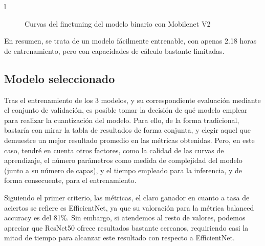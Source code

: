 l\begin{figure}[H]
	\centering
	\caption{Curvas del finetuning del modelo binario con Mobilenet V2}
	\label{fig:curvasmbin}
\end{figure}

En resumen, se trata de un modelo fácilmente entrenable, con apenas 2.18 horas de entrenamiento, pero con capacidades de cálculo bastante limitadas.

\subsection{Modelo seleccionado}

Tras el entrenamiento de los 3 modelos, y su correspondiente evaluación mediante el conjunto de validación, es posible tomar la decisión de qué modelo emplear para realizar la cuantización del modelo. Para ello, de la forma tradicional, bastaría con mirar la tabla de resultados de forma conjunta, y elegir aquel que demuestre un mejor resultado promedio en las métricas obtenidas. Pero, en este caso, tendré en cuenta otros factores, como la calidad de las curvas de aprendizaje, el número parámetros como medida de complejidad del modelo (junto a su número de capas), y el tiempo empleado para la inferencia, y de forma consecuente, para el entrenamiento.

Siguiendo el primer criterio, las métricas, el claro ganador en cuanto a tasa de aciertos se refiere es EfficientNet, ya que su valoración para la métrica balanced accuracy es del 81\%. Sin embargo, si atendemos al resto de valores, podemos apreciar que ResNet50 ofrece resultados bastante cercanos,  requiriendo casi la mitad de tiempo para alcanzar este resultado con respecto a EfficientNet.


